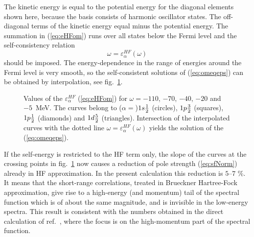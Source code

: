 %
The kinetic energy is equal to 
the potential energy for the diagonal elements shown here, 
because the basis consists of harmonic oscillator states.
The off-diagonal terms of the kinetic energy equal minus the potential energy.
The summation in (\ref{eq:eHFom})
runs over all states below the Fermi level and the 
self-consistency relation 
%
	\begin{equation}
		\omega
	=
		\varepsilon^{HF}_\alpha(\omega)
	\label{eq:omeqeps}
	\end{equation}
%
should be imposed.
The energy-dependence in the range of energies around the Fermi level is very
smooth, so the self-consistent solutions of (\ref{eq:omeqeps}) can be 
obtained by interpolation, see fig.~\ref{fig:Ehf}.
\begin{figure}
\centerline{}
\caption[]{
Values of the $\varepsilon^{HF}_\alpha$ (\ref{eq:eHFom}) 
for $\omega=-110$, $-70$, $-40$, $-20$ and~$-5$~MeV.
The curves belong to ($\alpha=$)$1s{\mbox{$\frac{1}{2}$}}$ (circles),
$1p{\mbox{$\frac{3}{2}$}}$ (squares), $1p{\mbox{$\frac{1}{2}$}}$ (diamonds) and $1d{\mbox{$\frac{{5}}{{2}}$}}$ (triangles).
Intersection of the interpolated curves with the dotted line 
$\omega=\varepsilon^{HF}_\alpha(\omega)$ yields the solution
of the (\ref{eq:omeqeps}).
\label{fig:Ehf}}
\end{figure}
If the self-energy is restricted to the HF term only, the slope of the curves 
at the crossing points in fig.~\ref{fig:Ehf} now causes a reduction of pole
strength (\ref{eq:sfNorm}) already in HF approximation. In the present 
calculation this reduction is $5$--$7$ \%. It means that the short-range 
correlations,
treated in Brueckner Hartree-Fock approximation, give rise to a high-energy (and
momentum) tail of the spectral function which is of about the same magnitude,
and is 
invisible in the low-energy spectra. This result is consistent with
the numbers obtained in the direct calculation of ref.~\cite{MPD95}, where 
the focus is on the high-momentum part of the spectral 
function. 


